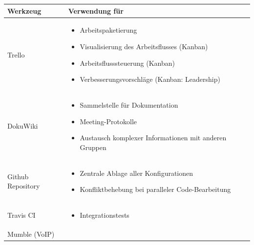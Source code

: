 \newpage
\begin{minipage}{\textwidth}
\begin{center}
\begin{tabular}{lp{12cm}}
\toprule
Werkzeug & Verwendung für \\
\midrule
Trello &
  \begin{minipage}[t]{1\textwidth}
    \begin{itemize}
    \item Arbeitspaketierung
    \item Visualisierung des Arbeitsflusses (Kanban)
    \item Arbeitsflusssteuerung (Kanban)
    \item Verbesserungsvorschläge (Kanban: Leadership)
    \end{itemize}
  \end{minipage} \\
\midrule
DokuWiki &
  \begin{minipage}[t]{1\textwidth}
    \begin{itemize}
    \item Sammelstelle für Dokumentation
    \item Meeting-Protokolle
    \item Austausch komplexer Informationen mit anderen Gruppen
    \end{itemize}
  \end{minipage}\\
\midrule
Github Repository &
  \begin{minipage}[t]{1\textwidth}
    \begin{itemize}
    \item Zentrale Ablage aller Konfigurationen
    \item Konfliktbehebung bei paralleler Code-Bearbeitung
    \end{itemize}
  \end{minipage}\\
  \midrule
Travis CI &
  \begin{minipage}[t]{1\textwidth}
    \begin{itemize}
    \item Integrationstests
    \end{itemize}
  \end{minipage}\\
  \midrule
Mumble (VoIP) &
  \begin{minipage}[t]{1\textwidth}
    \begin{itemize}

\end{itemize}
\end{minipage}
\end{tabular}
\end{center}
\end{minipage}
